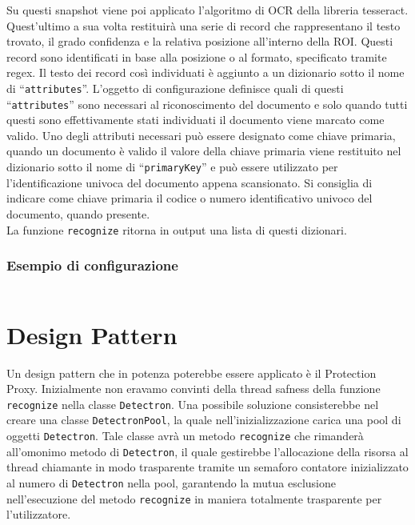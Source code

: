 \documentclass[12pt,a4paper]{article}
\begin{document}
Su questi snapshot viene poi applicato l'algoritmo di OCR della libreria
tesseract. Quest'ultimo a sua volta restituirà una serie di record che
rappresentano il testo trovato, il grado confidenza e la relativa
posizione all'interno della ROI. Questi record sono identificati in base
alla posizione o al formato, specificato tramite regex. Il testo dei
record così individuati è aggiunto a un dizionario sotto il nome di
``\texttt{attributes}''. L'oggetto di configurazione definisce quali di
questi ``\texttt{attributes}'' sono necessari al riconoscimento del
documento e solo quando tutti questi sono effettivamente stati
individuati il documento viene marcato come valido. Uno degli attributi
necessari può essere designato come chiave primaria, quando un documento
è valido il valore della chiave primaria viene restituito nel dizionario
sotto il nome di ``\texttt{primaryKey}'' e può essere utilizzato per
l'identificazione univoca del documento appena scansionato. Si consiglia
di indicare come chiave primaria il codice o numero identificativo
univoco del documento, quando presente.\\
La funzione \texttt{recognize} ritorna in output una lista di questi
dizionari.

\pagebreak

\subsubsection{Esempio di configurazione}

\inputminted[frame=lines,framesep=1em]{python}{config.py}

\pagebreak

\section{Design Pattern}

Un design pattern che in potenza poterebbe essere applicato è il
Protection Proxy. Inizialmente non eravamo convinti della thread safness
della funzione \texttt{recognize} nella classe \texttt{Detectron}. Una
possibile soluzione consisterebbe nel creare una classe
\texttt{DetectronPool}, la quale nell'inizializzazione carica una pool
di oggetti \texttt{Detectron}. Tale classe avrà un metodo
\texttt{recognize} che rimanderà all'omonimo metodo di
\texttt{Detectron}, il quale gestirebbe l'allocazione della risorsa al
thread chiamante in modo trasparente tramite un semaforo contatore
inizializzato al numero di \texttt{Detectron} nella pool, garantendo la
mutua esclusione nell'esecuzione del metodo \texttt{recognize} in
maniera totalmente trasparente per l'utilizzatore.
\end{document}
